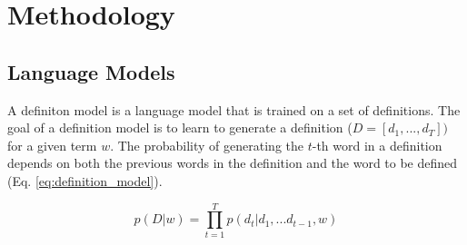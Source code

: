 \section{Methodology}

\subsection{Language Models}
A definiton model is a language model that is trained on a set of definitions.
The goal of a definition model is to learn to generate a definition ($ D = [d_1,
    ..., d_T])$ for a given term $w$. The probability of generating the $t$-th word
in a definition depends on both the previous words in the definition and the
word to be defined (Eq. \ref{eq:definition_model}).

\begin{equation}
    \label{eq:definition_model}
    p(D | w) = \prod_{t=1}^{T} p(d_t | d_1,...d_{t-1}, w)
\end{equation}






